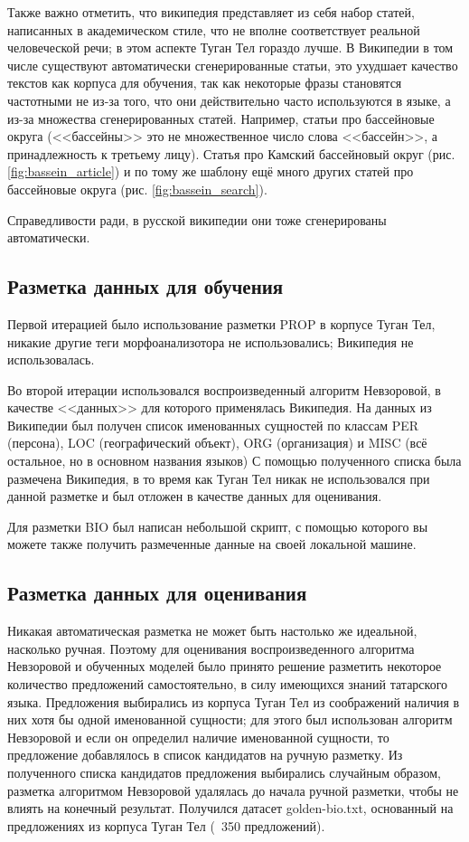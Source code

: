 Также важно отметить, что википедия представляет из себя набор статей, написанных в академическом стиле, что не вполне соответствует реальной человеческой речи; в этом аспекте Туган Тел гораздо лучше. В Википедии в том числе существуют автоматически сгенерированные статьи, это ухудшает качество текстов как корпуса для обучения, так как некоторые фразы становятся частотными не из-за того, что они действительно часто используются в языке, а из-за множества сгенерированных статей. Например, статьи про бассейновые округа (<<бассейны>> это не множественное число слова <<бассейн>>, а принадлежность к третьему лицу). Статья про Камский бассейновый округ (рис. \ref{fig:bassein_article}) и по тому же шаблону ещё много других статей про бассейновые округа (рис. \ref{fig:bassein_search}).

Справедливости ради, в русской википедии они тоже сгенерированы автоматически.

\subsection{Разметка данных для обучения}

Первой итерацией было использование разметки PROP в корпусе Туган Тел, никакие другие теги морфоанализотора не использовались; Википедия не использовалась. 

Во второй итерации использовался воспроизведенный алгоритм Невзоровой, в качестве <<данных>> для которого применялась Википедия. На данных из Википедии был получен список именованных сущностей по классам PER (персона), LOC (географический объект), ORG (организация) и MISC (всё остальное, но в основном названия языков) С помощью полученного списка была размечена Википедия, в то время как Туган Тел никак не использовался при данной разметке и был отложен в качестве данных для оценивания.

Для разметки BIO был написан небольшой скрипт, с помощью которого вы можете также получить размеченные данные на своей локальной машине.

\subsection{Разметка данных для оценивания}

Никакая автоматическая разметка не может быть настолько же идеальной, насколько ручная. Поэтому для оценивания воспроизведенного алгоритма Невзоровой и обученных моделей было принято решение разметить некоторое количество предложений самостоятельно, в силу имеющихся знаний татарского языка. Предложения выбирались из корпуса Туган Тел из соображений наличия в них хотя бы одной именованной сущности; для этого был использован алгоритм Невзоровой и если он определил наличие именованной сущности, то предложение добавлялось в список кандидатов на ручную разметку. Из полученного списка кандидатов предложения выбирались случайным образом, разметка алгоритмом Невзоровой удалялась до начала ручной разметки, чтобы не влиять на конечный результат. Получился датасет golden-bio.txt, основанный на предложениях из корпуса Туган Тел (~350 предложений).

